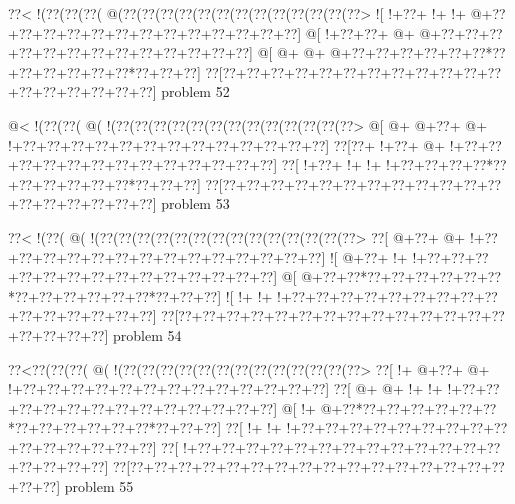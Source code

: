 \vbox{\vbox{\goo
\0??<\- !(\0??(\0??(\0??(\- @(\0??(\0??(\0??(\0??(\0??(\0??(\0??(\0??(\0??(\0??(\0??(\0??(\0??>
\- ![\- !+\0??+\- !+\- !+\- @+\0??+\0??+\0??+\0??+\0??+\0??+\0??+\0??+\0??+\0??+\0??+\0??+\0??]
\- @[\- !+\0??+\0??+\- @+\- @+\0??+\0??+\0??+\0??+\0??+\0??+\0??+\0??+\0??+\0??+\0??+\0??+\0??]
\- @[\- @+\- @+\- @+\0??+\0??+\0??+\0??+\0??+\0??*\0??+\0??+\0??+\0??+\0??+\0??*\0??+\0??+\0??]
\0??[\0??+\0??+\0??+\0??+\0??+\0??+\0??+\0??+\0??+\0??+\0??+\0??+\0??+\0??+\0??+\0??+\0??+\0??]
}
\hfil problem 52\hfil\break
}



\vbox{\vbox{\goo
\- @<\- !(\0??(\0??(\- @(\- !(\0??(\0??(\0??(\0??(\0??(\0??(\0??(\0??(\0??(\0??(\0??(\0??(\0??>
\- @[\- @+\- @+\0??+\- @+\- !+\0??+\0??+\0??+\0??+\0??+\0??+\0??+\0??+\0??+\0??+\0??+\0??+\0??]
\0??[\0??+\- !+\0??+\- @+\- !+\0??+\0??+\0??+\0??+\0??+\0??+\0??+\0??+\0??+\0??+\0??+\0??+\0??]
\0??[\- !+\0??+\- !+\- !+\- !+\0??+\0??+\0??+\0??*\0??+\0??+\0??+\0??+\0??+\0??*\0??+\0??+\0??]
\0??[\0??+\0??+\0??+\0??+\0??+\0??+\0??+\0??+\0??+\0??+\0??+\0??+\0??+\0??+\0??+\0??+\0??+\0??]
}
\hfil problem 53\hfil\break
}



\vbox{\vbox{\goo
\0??<\- !(\0??(\- @(\- !(\0??(\0??(\0??(\0??(\0??(\0??(\0??(\0??(\0??(\0??(\0??(\0??(\0??(\0??>
\0??[\- @+\0??+\- @+\- !+\0??+\0??+\0??+\0??+\0??+\0??+\0??+\0??+\0??+\0??+\0??+\0??+\0??+\0??]
\- ![\- @+\0??+\- !+\- !+\0??+\0??+\0??+\0??+\0??+\0??+\0??+\0??+\0??+\0??+\0??+\0??+\0??+\0??]
\- @[\- @+\0??+\0??*\0??+\0??+\0??+\0??+\0??+\0??*\0??+\0??+\0??+\0??+\0??+\0??*\0??+\0??+\0??]
\- ![\- !+\- !+\- !+\0??+\0??+\0??+\0??+\0??+\0??+\0??+\0??+\0??+\0??+\0??+\0??+\0??+\0??+\0??]
\0??[\0??+\0??+\0??+\0??+\0??+\0??+\0??+\0??+\0??+\0??+\0??+\0??+\0??+\0??+\0??+\0??+\0??+\0??]
}
\hfil problem 54\hfil\break
}



\vbox{\vbox{\goo
\0??<\0??(\0??(\0??(\- @(\- !(\0??(\0??(\0??(\0??(\0??(\0??(\0??(\0??(\0??(\0??(\0??(\0??(\0??>
\0??[\- !+\- @+\0??+\- @+\- !+\0??+\0??+\0??+\0??+\0??+\0??+\0??+\0??+\0??+\0??+\0??+\0??+\0??]
\0??[\- @+\- @+\- !+\- !+\- !+\0??+\0??+\0??+\0??+\0??+\0??+\0??+\0??+\0??+\0??+\0??+\0??+\0??]
\- @[\- !+\- @+\0??*\0??+\0??+\0??+\0??+\0??+\0??*\0??+\0??+\0??+\0??+\0??+\0??*\0??+\0??+\0??]
\0??[\- !+\- !+\- !+\0??+\0??+\0??+\0??+\0??+\0??+\0??+\0??+\0??+\0??+\0??+\0??+\0??+\0??+\0??]
\0??[\- !+\0??+\0??+\0??+\0??+\0??+\0??+\0??+\0??+\0??+\0??+\0??+\0??+\0??+\0??+\0??+\0??+\0??]
\0??[\0??+\0??+\0??+\0??+\0??+\0??+\0??+\0??+\0??+\0??+\0??+\0??+\0??+\0??+\0??+\0??+\0??+\0??]
}
\hfil problem 55\hfil\break
}



